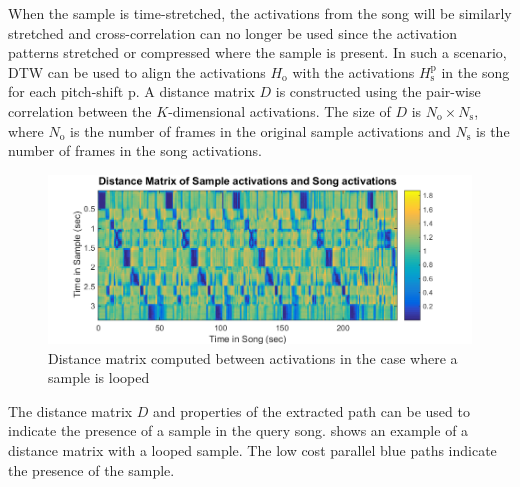 \documentclass{article}
\begin{document}
When the sample is time-stretched, the activations from the song will be similarly stretched and cross-correlation can no longer be used since the activation patterns stretched or compressed where the sample is present.
%
In such a scenario, DTW can be used to align the activations $H_\mathrm{o}$ with the activations $H_{\mathrm{s}}^{\mathrm{p}}$ in the song for each pitch-shift $\mathrm{p}$. A distance matrix $D$ is constructed using the pair-wise correlation between the $K$-dimensional activations. The size of $D$ is $N_\mathrm{o}\times N_\mathrm{s}$, where $N_\mathrm{o}$ is the number of frames in the original sample activations and $N_\mathrm{s}$ is the number of frames in the song activations.
\begin{figure}[t]
\centering
\includegraphics[width=\linewidth]{distmat.png}
\caption{Distance matrix computed between activations in the case where a sample is looped}
\label{fig2}
\end{figure}
The distance matrix $D$ and properties of the extracted path can be used to indicate the presence of a sample in the query song.  shows an example of a distance matrix with a looped sample. The low cost parallel blue paths indicate the presence of the sample. 
\end{document}
